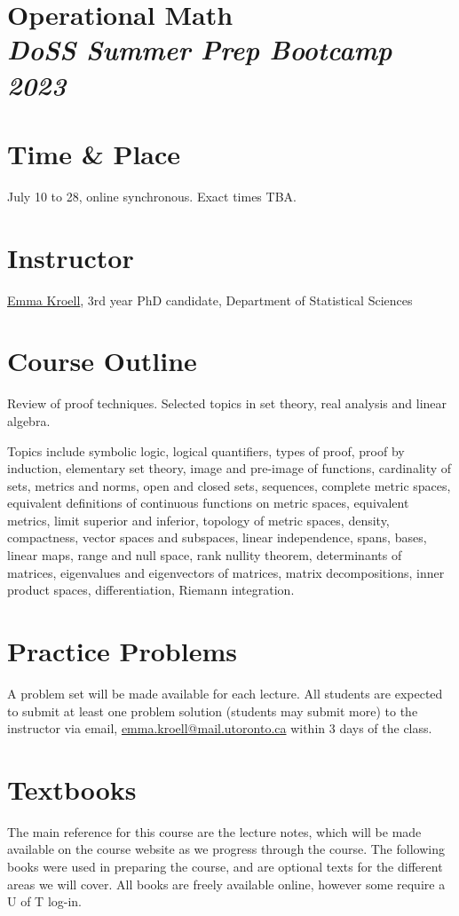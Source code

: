 \documentclass[12pt]{article}
\date{ }
\begin{document}
\section*{Operational Math\\  {\it{DoSS Summer Prep Bootcamp 2023}}}

\section{Time \& Place}
July 10 to 28, online synchronous. Exact times TBA.

\section{Instructor}
\href{https://www.emmakroell.ca}{Emma Kroell}, 3rd year PhD candidate, Department of Statistical Sciences


\section{Course Outline}
Review of proof techniques. Selected topics in set theory, real analysis and linear algebra. 

\vspace{1em}

\noindent
Topics include symbolic logic, logical quantifiers, types of proof, proof by induction, elementary set theory, image and pre-image of functions, cardinality of sets, metrics and norms, open and closed sets, sequences, complete metric spaces, equivalent definitions of continuous functions on metric spaces, equivalent metrics, limit superior and inferior, topology of metric spaces, density, compactness, vector spaces and subspaces, linear independence, spans, bases, linear maps, range and null space, rank nullity theorem, determinants of matrices, eigenvalues and eigenvectors of matrices, matrix decompositions, inner product spaces, differentiation, Riemann integration.

\section{Practice Problems}
A problem set will be made available for each lecture. All students are expected to submit at least one problem solution (students may submit more) to the instructor via email, \href{mailto:emma.kroell@mail.utoronto.ca}{emma.kroell@mail.utoronto.ca} within 3 days of the class.

\section{Textbooks}
The main reference for this course are the lecture notes, which will be made available on the course website as we progress through the course. The following books were used in preparing the course, and are optional texts for the different areas we will cover. All books are freely available online, however some require a U of T log-in.
\end{document}
